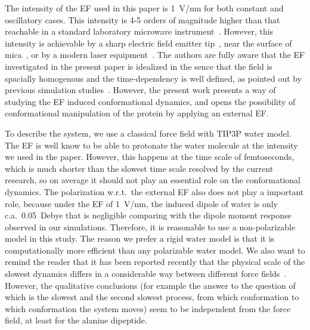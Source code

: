 \documentclass[a4paper,preprint,unsortedaddress,onecolumn]{revtex4-1}
\newcommand{\recheck}[1]{{\color{red} #1}}
\begin{document}

The intensity of the EF used in this paper is 1~V/nm for both constant
and oscillatory cases. This intensity is 4-5 orders of magnitude
higher than that reachable in a standard laboratory microwave
instrument~\cite{damm2012can}. However, this intensity is achievable
by a sharp electric field emitter tip~\cite{scovell2000phase}, near
the surface of mica~\cite{starzyk2013proteins}, or by a modern laser
equipment~\cite{vogel2008femtosecond}. The authors are fully aware
that the EF investigated in the present paper is idealized
\recheck{
  in the sence that the field is spacially homogenous and
  the time-dependency is well defined,} as pointed
out by previous simulation studies~\cite{budi2005electric,
  budi2007effect, budi2008comparative, toschi2008effects,
  astrakas2011electric, astrakas2012structural, damm2012can,
  starzyk2013proteins, english2009nonequilibrium,
  solomentsev2012effects}. However, the present work presents a way of
studying the EF induced conformational dynamics, and opens the
possibility of conformational manipulation of the protein by applying
an external EF.

To describe the system, we use a classical force field with TIP3P water model.
The EF is well know to be able to protonate the water molecule at the
intensity we used in the paper. However, this happens at the time
scale of femtoseconds, which is much shorter than the slowest time
scale resolved by the current research, so on average it should not play an essential role on the conformational dynamics.
The polarization w.r.t.~the external EF also does
not play a important role, because  under the EF of 1~V/nm, the induced dipole
of water is only c.a.~0.05~Debye that is negligible comparing with the
dipole moment response observed in our simulations.  Therefore, it is
reasonable to use a non-polarizable model in this study.  The reason we
prefer a rigid water model is that it is computationally more
efficient than any polarizable water model.  We also want to remind
the reader that it has been reported recently that the physical scale of the slowest
dynamics differs in a considerable way between different force
fields~\cite{vitalini2013speed}. However, the qualitative conclusions (for
example the answer to the question of which is the slowest and the second slowest process, from which
conformation to which conformation the system moves)
seem to be independent from the force field,
at least for the alanine dipeptide.




{}

\end{document}
